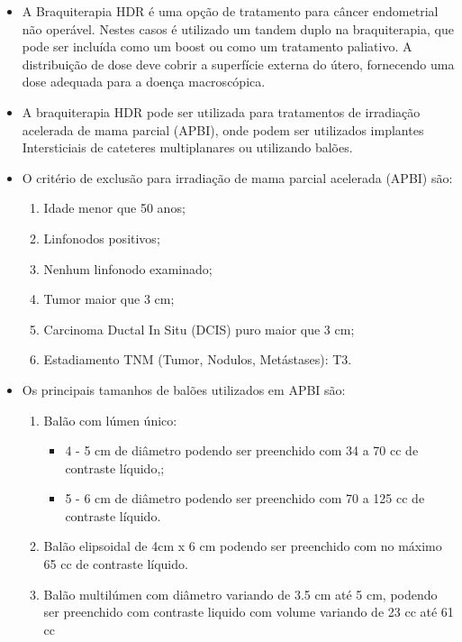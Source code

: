 \documentclass[11pt,a4paper]{article}
\newcounter{exemplo}
\begin{document}
\begin{exemplo}[8. Braquiterapia]
\begin{itemize}
        \item A Braquiterapia HDR é uma opção de tratamento para câncer endometrial não operável. Nestes casos é utilizado um tandem duplo na braquiterapia, que pode ser incluída como um boost ou como um tratamento paliativo. A distribuição de dose deve cobrir a superfície externa do útero, fornecendo uma dose adequada para a doença macroscópica.
        
        \item A braquiterapia HDR pode ser utilizada para tratamentos de irradiação acelerada de mama parcial (APBI), onde podem ser utilizados implantes Intersticiais de cateteres multiplanares ou utilizando balões. 
        
        \item O critério de exclusão para irradiação de mama parcial acelerada (APBI) são:
        
            \begin{enumerate}[label=\textcolor{CarnationPink}{\roman*.}]
                \item Idade menor que 50 anos;
                \item Linfonodos positivos;
                \item Nenhum linfonodo examinado;
                \item Tumor maior que 3 cm;
                \item Carcinoma Ductal In Situ (DCIS) puro maior que 3 cm;
                \item Estadiamento TNM (Tumor, Nodulos, Metástases): T3.
            \end{enumerate}


        \item Os principais tamanhos de balões utilizados em APBI são:
        
            \begin{enumerate}
                \item Balão com lúmen único:
                    \begin{itemize}
                        \item 4 - 5 cm de diâmetro podendo ser preenchido com 34 a 70 cc de contraste líquido,;
                        \item 5 - 6 cm de diâmetro podendo ser preenchido com 70 a 125 cc de contraste líquido.
                    \end{itemize}
                \item Balão elipsoidal de 4cm x 6 cm podendo ser preenchido com no máximo 65 cc de contraste líquido.
                \item Balão multilúmen com diâmetro variando de 3.5 cm até 5 cm, podendo ser preenchido com contraste liquido com volume variando de 23 cc até 61 cc
            \end{enumerate}


\end{itemize}
\end{exemplo}
\end{document}
